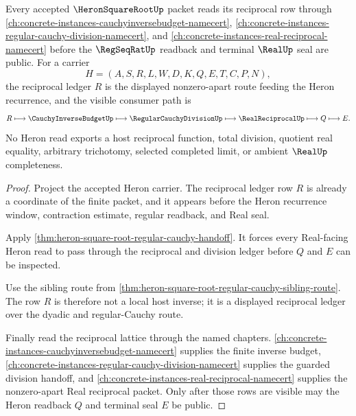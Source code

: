 \begin{theorem}
\label{thm:heron-square-root-real-reciprocal-forward-link}
Every accepted $\HeronSquareRootUp$ packet reads its reciprocal row through \autoref{ch:concrete-instances-cauchyinversebudget-namecert}, \autoref{ch:concrete-instances-regular-cauchy-division-namecert}, and \autoref{ch:concrete-instances-real-reciprocal-namecert} before the $\RegSeqRatUp$ readback and terminal $\RealUp$ seal are public. For a carrier
$$
H=(A,S,R,L,W,D,K,Q,E,T,C,P,N),
$$
the reciprocal ledger $R$ is the displayed nonzero-apart route feeding the Heron recurrence, and the visible consumer path is
$$
R \longmapsto \CauchyInverseBudgetUp \longmapsto \RegularCauchyDivisionUp \longmapsto \RealReciprocalUp \longmapsto Q \longmapsto E .
$$
No Heron read exports a host reciprocal function, total division, quotient real equality, arbitrary trichotomy, selected completed limit, or ambient $\RealUp$ completeness.
\end{theorem}
\begin{proof}
Project the accepted Heron carrier. The reciprocal ledger row $R$ is already a coordinate of the finite packet, and it appears before the Heron recurrence window, contraction estimate, regular readback, and Real seal.

Apply \autoref{thm:heron-square-root-regular-cauchy-handoff}. It forces every Real-facing Heron read to pass through the reciprocal and division ledger before $Q$ and $E$ can be inspected.

Use the sibling route from \autoref{thm:heron-square-root-regular-cauchy-sibling-route}. The row $R$ is therefore not a local host inverse; it is a displayed reciprocal ledger over the dyadic and regular-Cauchy route.

Finally read the reciprocal lattice through the named chapters. \autoref{ch:concrete-instances-cauchyinversebudget-namecert} supplies the finite inverse budget, \autoref{ch:concrete-instances-regular-cauchy-division-namecert} supplies the guarded division handoff, and \autoref{ch:concrete-instances-real-reciprocal-namecert} supplies the nonzero-apart Real reciprocal packet. Only after those rows are visible may the Heron readback $Q$ and terminal seal $E$ be public.
\end{proof}
